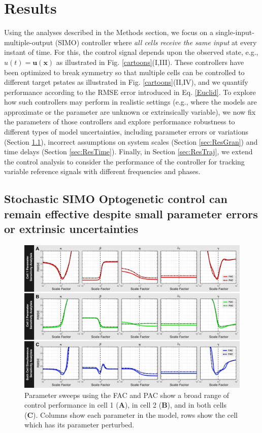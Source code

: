 \documentclass[12pt]{iopart}
\begin{document}
\section{Results}

Using the analyses described in the Methods section, we focus on a single-input-multiple-output (SIMO) controller where {\em all cells receive the same input} at every instant of time. For this, the control signal depends upon the observed state, e.g., $u(t) = \mathbf{u}(\mathbf{x})$ as illustrated in Fig. \ref{cartoons}(I,III). These controllers have been optimized to break symmetry so that multiple cells can be controlled to different target pstates as illustrated in Fig. \ref{cartoons}(II,IV), and we quantify performance according to the RMSE error introduced in Eq. \ref{Euclid}. To explore how such controllers may perform in realistic settings (e.g., where the models are approximate or the parameter are unknown or extrinsically variable), we now fix the parameters of those controllers and explore performance robustness to different types of model uncertainties, including parameter errors or variations (Section \ref{sec:ResPars}), incorrect assumptions on system scales (Section \ref{sec:ResGran}) and time delays (Section \ref{sec:ResTime}). Finally, in Section \ref{sec:ResTraj}, we extend the control analysis to consider the performance of the controller for tracking variable reference signals with different frequencies and phases.

 \subsection{Stochastic SIMO Optogenetic control can remain effective despite small parameter errors or extrinsic uncertainties}\label{sec:ResPars}
\begin{figure}
\begin{center}
\includegraphics[width=1\textwidth]{ParameterPerturbation.pdf}
\caption{Parameter sweeps using the FAC and PAC show a broad range of control performance in cell 1 ({\bf A}),  in cell 2 ({\bf B}), and in both cells ({\bf C}). Columns show each parameter in the model, rows show the cell which has its parameter perturbed. }
\label{Parameter}
\end{center}
\end{figure}
\end{document}
